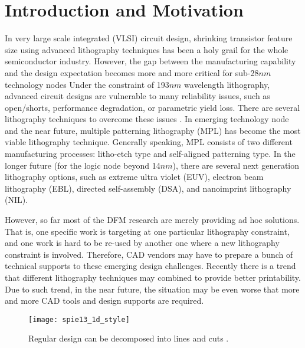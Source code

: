 

\section{Introduction and Motivation}

In very large scale integrated (VLSI) circuit design, shrinking transistor feature size using advanced lithography techniques has been a holy grail for the whole semiconductor industry.
However, the gap between the manufacturing capability and the design expectation becomes more and more critical for sub-28$nm$ technology nodes
Under the constraint of 193$nm$ wavelength lithography, advanced circuit designs are vulnerable to many reliability issues,
such as open/shorts, performance degradation, or parametric yield loss.
There are several lithography techniques to overcome these issues \cite{LITH_TCAD2013_Pan}.
In emerging technology node and the near future, multiple patterning lithography (MPL) has become the most viable lithography technique.
Generally speaking, MPL consists of two different manufacturing processes: litho-etch type and self-aligned patterning type.
In the longer future (for the logic node beyond 14$nm$), there are several next generation lithography options,
such as extreme ultra violet (EUV), electron beam lithography (EBL), directed self-assembly (DSA), and nanoimprint lithography (NIL).

However, so far most of the DFM research are merely providing ad hoc solutions.
That is, one specific work is targeting at one particular lithography constraint,
and one work is hard to be re-used by another one where a new lithography constraint is involved.
Therefore, CAD vendors may have to prepare a bunch of technical supports to these emerging design challenges.
Recently there is a trend that different lithography techniques may combined to provide better printability.
Due to such trend, in the near future, the situation may be even worse that more and more CAD tools and design supports are required.

\begin{figure}[h!]
    \centering
    \texttt{[image: spie13\_1d\_style]}
    \caption{Regular design can be decomposed into lines and cuts \cite{CELL_SPIE2013_Smayling}.}
    \label{fig:spie13_1d_style}
\end{figure}

